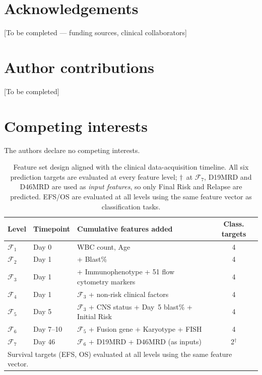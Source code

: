 \documentclass[pdflatex,sn-nature]{sn-jnl}
\begin{document}
\section*{Acknowledgements}

[To be completed — funding sources, clinical collaborators]

\section*{Author contributions}

[To be completed]

\section*{Competing interests}

The authors declare no competing interests.


\begin{table}[ht]
\caption{Feature set design aligned with the clinical data-acquisition
timeline. All six prediction targets are evaluated at every feature
level; $\dagger$~at $\mathcal{F}_7$, D19MRD and
D46MRD are used as \emph{input features}, so only Final Risk and
Relapse are predicted. EFS/OS are evaluated at all levels using
the same feature vector as classification tasks.}
\label{tab:expdesign}
\centering
\small
\begin{tabular}{lllc}
\toprule
\textbf{Level} & \textbf{Timepoint} & \textbf{Cumulative features added} & \textbf{Class. targets} \\
\midrule
$\mathcal{F}_1$     & Day 0     & WBC count, Age & 4 \\
$\mathcal{F}_2$     & Day 1     & + Blast\% & 4 \\
$\mathcal{F}_3$     & Day 1     & + Immunophenotype + 51 flow cytometry markers & 4 \\
$\mathcal{F}_4$     & Day 1     & $\mathcal{F}_3$ + non-risk clinical factors & 4 \\
$\mathcal{F}_5$     & Day 5     & $\mathcal{F}_3$ + CNS status + Day~5 blast\% + Initial Risk & 4 \\
$\mathcal{F}_6$     & Day 7--10 & $\mathcal{F}_5$ + Fusion gene + Karyotype + FISH & 4 \\
$\mathcal{F}_7$     & Day 46    & $\mathcal{F}_6$ + D19MRD + D46MRD (as inputs) & 2$^\dagger$ \\
\bottomrule
\multicolumn{4}{l}{Survival targets (EFS, OS) evaluated at all levels using the same feature vector.}
\end{tabular}
\end{table}
\end{document}
